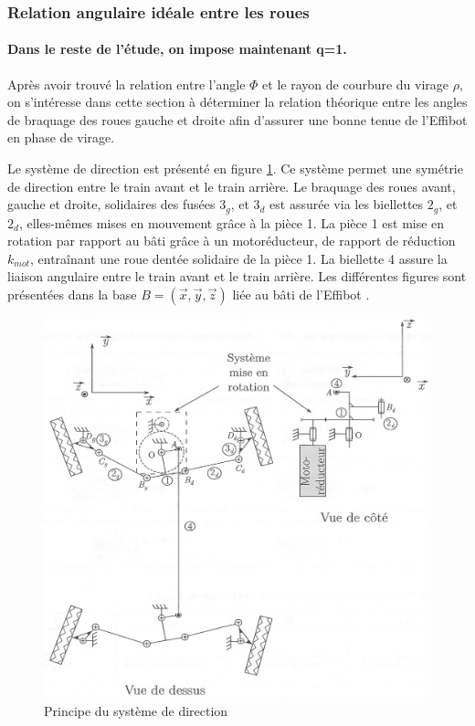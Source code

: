 


\subsubsection{Relation angulaire idéale entre les roues}

\paragraph{Dans le reste de l'étude, on impose maintenant q=1.}

Après avoir trouvé la relation entre l'angle $\Phi$ et le rayon de courbure du virage $\rho$, on s'intéresse dans cette section à déterminer la relation théorique entre les angles de braquage des roues gauche et droite
afin d'assurer une bonne tenue de l'\og Effibot \fg en phase de virage.

Le système de direction est présenté en figure \ref{fig09}. Ce système permet une symétrie de direction entre le train avant et le train arrière. Le braquage des roues avant, gauche et droite, solidaires des fusées $3_g$, et $3_d$ est assurée via les biellettes $2_g$, et $2_d$, elles-mêmes mises en mouvement grâce à la pièce 1. La pièce 1 est mise en rotation par rapport au bâti grâce à un motoréducteur, de rapport de réduction $k_{mot}$, entraînant une roue dentée solidaire de la pièce 1. La biellette 4 assure la liaison angulaire entre le train avant et le train arrière. Les différentes figures sont présentées dans la base $B=(\overrightarrow{x},\overrightarrow{y},\overrightarrow{z})$ liée au bâti de l'\og Effibot \fg.

\begin{figure}[ht!]
\begin{center}
 \includegraphics[width=0.6\linewidth]{img/fig10}
\end{center}
\caption{Principe du système de direction}
\label{fig09}
\end{figure}

